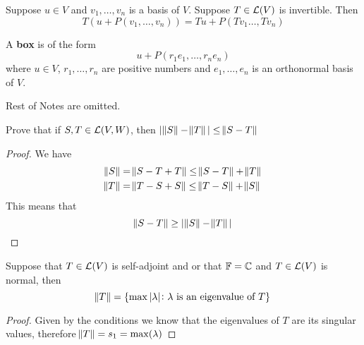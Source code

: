 \documentclass{extarticle}
\begin{document}
\begin{proposition}
    Suppose \(u \in V\) and \(v_1, \ldots, v_n \) is a basis of \(V\). Suppose 
    \(T \in \mathcal{L}(V)\) is invertible. Then 
    \[T(u + P(v_1, \ldots, v_n)) = Tu + P(Tv_1 \ldots, Tv_n)\]
\end{proposition}

\begin{definition}[box]
    A \textbf{box} is of the form 
    \[u + P(r_1 e_1, \ldots, r_n e_n)\]
    where \(u \in V\), \(r_1, \ldots, r_n\) are positive numbers and 
    \(e_1, \ldots, e_n\) is an orthonormal basis of \(V\). 
\end{definition}

Rest of Notes are omitted. 




\newpage 
{}

\begin{problem}{1}
    Prove that if \(S, T \in \mathcal{L}(V, W)\), then 
    \(|\norm{S} - \norm{T}| \leq \norm{S - T}\)
\end{problem}

\begin{proof}

We have 
\begin{align*}
    \norm{S} &= \norm{S - T + T} \leq \norm{S - T} + \norm{T} \\ 
    \norm{T} &= \norm{T - S + S} \leq \norm{T - S} + \norm{S}
\end{align*}
This means that 
\[\norm{S - T} \geq |\norm{S} - \norm{T}|\]


\end{proof}


\begin{problem}{2}
    Suppose that \(T \in \mathcal{L}(V)\) is self-adjoint and 
    or that \(\mathbb{F} = \mathbb{C}\) and \(T \in \mathcal{L}(V)\) is normal, then 
    \[\norm{T} = \{\max |\lambda| \colon \lambda 
    \text{ is an eigenvalue of } T\}\]
\end{problem}

\begin{proof}
Given by the conditions we know that the eigenvalues of 
\(T\) are its singular values, therefore 
\(\norm{T} = s_1 = \max(\lambda)\)
\end{proof}
\end{document}
